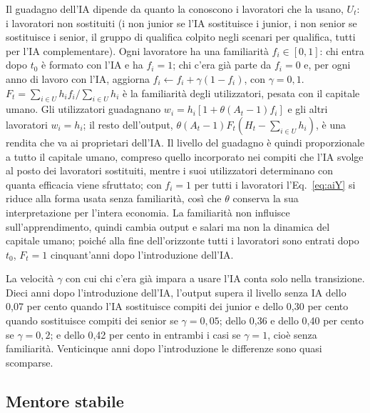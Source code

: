 \documentclass[preprint,12pt,authoryear]{elsarticle}
\begin{document}
Il guadagno dell'IA dipende da quanto la conoscono i lavoratori che la usano, $U_t$: i lavoratori non sostituiti (i non junior se l'IA sostituisce i junior, i non senior se sostituisce i senior, il gruppo di qualifica colpito negli scenari per qualifica, tutti per l'IA complementare). Ogni lavoratore ha una familiarità $f_i\in[0,1]$: chi entra dopo $t_0$ è formato con l'IA e ha $f_i=1$; chi c'era già parte da $f_i=0$ e, per ogni anno di lavoro con l'IA, aggiorna $f_i \leftarrow f_i+\gamma(1-f_i)$, con $\gamma=0{,}1$. $F_t=\sum_{i\in U}h_if_i/\sum_{i\in U}h_i$ è la familiarità degli utilizzatori, pesata con il capitale umano. Gli utilizzatori guadagnano $w_i=h_i[1+\theta(A_t-1)f_i]$ e gli altri lavoratori $w_i=h_i$; il resto dell'output, $\theta(A_t-1)F_t(H_t-\sum_{i\in U}h_i)$, è una rendita che va ai proprietari dell'IA. Il livello del guadagno è quindi proporzionale a tutto il capitale umano, compreso quello incorporato nei compiti che l'IA svolge al posto dei lavoratori sostituiti, mentre i suoi utilizzatori determinano con quanta efficacia viene sfruttato; con $f_i=1$ per tutti i lavoratori l'Eq.~\eqref{eq:aiY} si riduce alla forma usata senza familiarità, così che $\theta$ conserva la sua interpretazione per l'intera economia. La familiarità non influisce sull'apprendimento, quindi cambia output e salari ma non la dinamica del capitale umano; poiché alla fine dell'orizzonte tutti i lavoratori sono entrati dopo $t_0$, $F_t=1$ cinquant'anni dopo l'introduzione dell'IA.

La velocità $\gamma$ con cui chi c'era già impara a usare l'IA conta solo nella transizione. Dieci anni dopo l'introduzione dell'IA, l'output supera il livello senza IA dello 0,07 per cento quando l'IA sostituisce compiti dei junior e dello 0,30 per cento quando sostituisce compiti dei senior se $\gamma=0{,}05$; dello 0,36 e dello 0,40 per cento se $\gamma=0{,}2$; e dello 0,42 per cento in entrambi i casi se $\gamma=1$, cioè senza familiarità. Venticinque anni dopo l'introduzione le differenze sono quasi scomparse.

\subsection{Mentore stabile}
\end{document}
